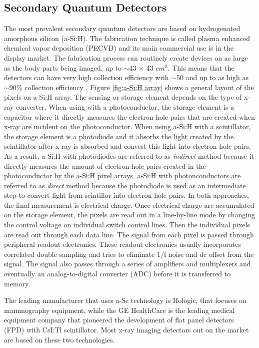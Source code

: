 \subsection{Secondary Quantum Detectors}
The most prevalent secondary quantum detectors are based on hydrogenated amorphous silicon (a-Si:H).  The fabrication technique is called plasma enhanced chemical vapor deposition (PECVD) and its main commercial use is in the display market.  The fabrication process can routinely create devices on as large as the body parts being imaged, up to $\sim$43 $\times$ 43 $cm^2$.  This means that the detectors can have very high collection efficiency with $\sim$50 and up to as high as $\sim$90$\%$ collection efficiency \cite{yorkston2007}.
Figure \ref{fig:a-Si:H array} shows a general layout of the pixels on a-Si:H array.  The sensing or storage element depends on the type of x-ray converter.  When using with a photoconductor, the storage element is a capacitor where it directly measures the electron-hole pairs that are created when x-ray are incident on the photoconductor.  When using a-Si:H with a scintillator, the storage element is a photodiode and it absorbs the light created by the scintillator after x-ray is absorbed and convert this light into electron-hole pairs.  As a result, a-Si:H with photodiodes are referred to as \textit{indirect} method because it directly measures the amount of electron-hole pairs created in the photoconductor by the a-Si:H pixel arrays.  a-Si:H with photonconductors are referred to as \textit{direct} method because the photodiode is used as an intermediate step to convert light from scintillor into electron-hole pairs.  In both approaches, the final measurement is electrical charge.  
Once electrical charge are accumulated on the storage element, the pixels are read out in a line-by-line mode by changing the control voltage on individual switch control lines.  Then the individual pixels are read out through each data line.  The signal from each pixel is passed through peripheral readout electronics.  These readout electronics usually incorporates correlated double sampling and tries to eliminate 1/f noise and dc offset from the signal.  The signal also passes through a series of amplifiers and multiplexers and eventually an analog-to-digital converter (ADC) before it is transferred to memory.  

The leading manufacturer that uses a-Se technology is Hologic, that focuses on mammography equipment, while the GE HealthCare is the leading medical equipment company that pioneered the development of flat panel detectors (FPD) with CsI:Tl scintillator.  Most x-ray imaging detectors out on the market are based on these two technologies.  

